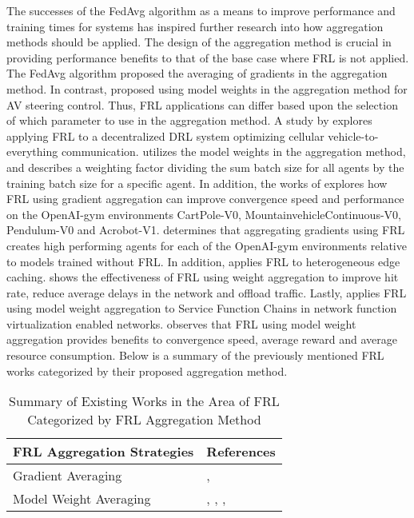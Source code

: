 The successes of the FedAvg algorithm as a means to improve performance and training 
times for systems has inspired further research into how aggregation methods should 
be applied.  The design of the aggregation method is crucial in providing performance 
benefits to that of the base case where FRL is not applied.  The FedAvg 
\cite{BrendanMcMahan2017a} algorithm proposed the averaging of gradients in the 
aggregation method.  In contrast, \cite{Liang2019} proposed using model weights in 
the aggregation method for AV steering control. Thus, FRL applications can differ 
based upon the selection of which parameter to use in the aggregation method.  A study 
by \cite{ZhangX2020} explores applying FRL to a decentralized DRL system optimizing 
cellular vehicle-to-everything communication. \cite{ZhangX2020} utilizes the model 
weights in the aggregation method, and describes a weighting factor dividing the sum 
batch size for all agents by the training batch size for a specific agent.  In addition, 
the works of \cite{LimHyun2021} explores how FRL using gradient aggregation can improve 
convergence speed and performance on the OpenAI-gym environments CartPole-V0, 
MountainvehicleContinuous-V0, Pendulum-V0 and Acrobot-V1.  \cite{LimHyun2021} determines 
that aggregating gradients using FRL creates high performing agents for each of the 
OpenAI-gym environments relative to models trained without FRL.  In addition, 
\cite{WangXiaofei2021} applies FRL to heterogeneous edge caching.  \cite{WangXiaofei2021} 
shows the effectiveness of FRL using weight aggregation to improve hit rate, reduce 
average delays in the network and offload traffic. Lastly, \cite{Huang2021} applies FRL 
using model weight aggregation to Service Function Chains in network function virtualization 
enabled networks. \cite{Huang2021} observes that FRL using model weight aggregation 
provides benefits to convergence speed, average reward and average resource consumption. 
Below is a summary of the previously mentioned FRL works categorized by their proposed 
aggregation method.

\begin{table}[H]
  \centering
  \caption{Summary of Existing Works in the Area of FRL Categorized by FRL Aggregation Method}
    \begin{tabular}{ll} \toprule
    \textbf{FRL Aggregation Strategies} & \textbf{References} \\ \midrule
    \midrule
    Gradient Averaging & \cite{BrendanMcMahan2017a}, \cite{LimHyun2021} \\
    Model Weight Averaging & \cite{Liang2019}, \cite{ZhangX2020}, \cite{WangXiaofei2021}, \cite{Huang2021} \\ \bottomrule
    \end{tabular}%
  \label{tab:addlabel}%
\end{table}%


